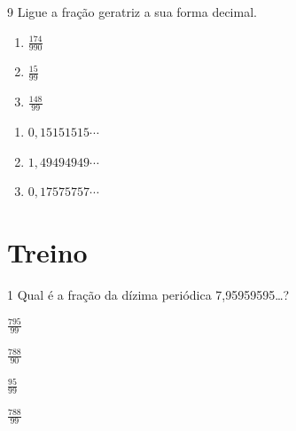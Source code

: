 \num{9} Ligue a fração geratriz a sua forma decimal. 

\begin{multicols}{2}
\begin{enumerate}[label=(\alph*)]
\item $\frac{174}{990}$  
\item $\frac{15}{99}$ 
\item $\frac{148}{99}$ 
\end{enumerate}
\begin{enumerate}[label=(\quad)]
\item $0,15151515\cdots{}$  
\item $1,49494949\cdots{}$  
\item $0,17575757\cdots{}$  
\end{enumerate}
\end{multicols}


\section*{Treino}

\num{1} Qual é a fração da dízima periódica 7,95959595\ldots?


\begin{escolha}[itemsep=0pt]
\item $\frac{795}{99}$
\item $\frac{788}{90}$
\item $\frac{95}{99}$
\item $\frac{788}{99}$
\end{escolha}

